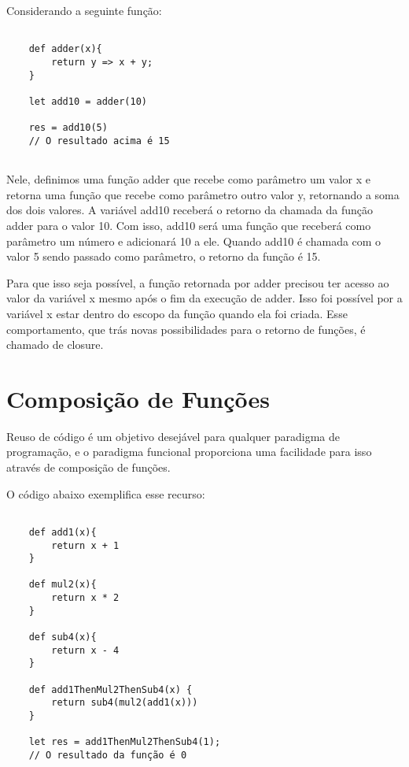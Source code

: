 Considerando a seguinte função:

\begin{lstlisting}[caption={Exemplo de Closure},label=closureex]

    def adder(x){
        return y => x + y;
    }

    let add10 = adder(10)

    res = add10(5)
    // O resultado acima é 15


\end{lstlisting}

Nele, definimos uma função adder que 
recebe como parâmetro um valor x e retorna uma função 
que recebe como parâmetro outro valor y, retornando a 
soma dos dois valores. A variável add10 receberá 
o retorno da chamada da função adder para o valor 10. 
Com isso, add10 será uma função que receberá como 
parâmetro um número e adicionará 10 a ele. Quando 
add10 é chamada com o valor 5 sendo passado como 
parâmetro, o retorno da função é 15.

Para que isso seja possível, a função retornada por 
adder precisou ter acesso ao valor da variável x mesmo 
após o fim da execução de adder. Isso foi possível 
por a variável x estar dentro do escopo da função 
quando ela foi criada. Esse comportamento, que trás 
novas possibilidades para o retorno de funções, 
é chamado de closure\cite{mflambdas}.



\section{Composição de Funções}

Reuso de código é um objetivo desejável para qualquer 
paradigma de programação, e o paradigma funcional 
proporciona uma facilidade para isso através de 
composição de funções\cite{realworldhaskell}.

O código abaixo exemplifica esse recurso:

\begin{lstlisting}[caption={Exemplo de Composição de Funções},label=fogex]

    def add1(x){
        return x + 1
    }

    def mul2(x){
        return x * 2
    }

    def sub4(x){
        return x - 4
    }

    def add1ThenMul2ThenSub4(x) {
        return sub4(mul2(add1(x)))
    }

    let res = add1ThenMul2ThenSub4(1);
    // O resultado da função é 0

\end{lstlisting}

